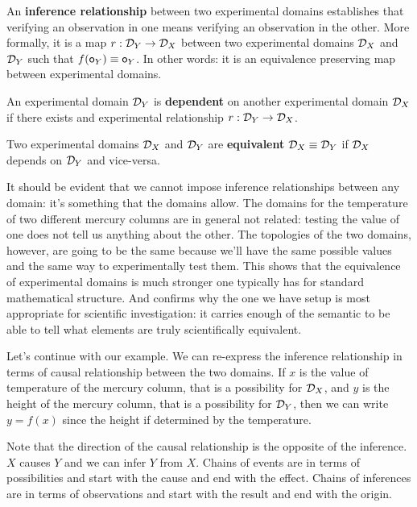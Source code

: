 \documentclass[11pt,letterpaper,fleqn]{memoir} %
\begin{document}
\begin{mathSection}
	\begin{defn}
		An \textbf{inference relationship} between two experimental domains establishes that verifying an observation in one means verifying an observation in the other. More formally, it is a map $r: \mathcal{D}_Y \to \mathcal{D}_X$ between two experimental domains $\mathcal{D}_X$ and $\mathcal{D}_Y$ such that $f(\mathsf{o}_Y) \equiv \mathsf{o}_Y$. In other words: it is an equivalence preserving map between experimental domains.
	\end{defn}
	\begin{defn}
		An experimental domain $\mathcal{D}_Y$ is \textbf{dependent} on another experimental domain $\mathcal{D}_X$ if there exists and experimental relationship $r: \mathcal{D}_Y \to \mathcal{D}_X$.
	\end{defn}
	\begin{defn}
		Two experimental domains $\mathcal{D}_X$ and $\mathcal{D}_Y$ are \textbf{equivalent} $\mathcal{D}_X \equiv \mathcal{D}_Y$ if $\mathcal{D}_X$ depends on $\mathcal{D}_Y$ and vice-versa.
	\end{defn}
\end{mathSection}

It should be evident that we cannot impose inference relationships between any domain: it's something that the domains allow. The domains for the temperature of two different mercury columns are in general not related: testing the value of one does not tell us anything about the other. The topologies of the two domains, however, are going to be the same because we'll have the same possible values and the same way to experimentally test them. This shows that the equivalence of experimental domains is much stronger one typically has for standard mathematical structure. And confirms why the one we have setup is most appropriate for scientific investigation: it carries enough of the semantic to be able to tell what elements are truly scientifically equivalent.

Let's continue with our example. We can re-express the inference relationship in terms of causal relationship between the two domains. If $x$ is the value of temperature of the mercury column, that is a possibility for $\mathcal{D}_X$, and $y$ is the height of the mercury column, that is a possibility for $\mathcal{D}_Y$, then we can write $y=f(x)$ since the height if determined by the temperature.

Note that the direction of the causal relationship is the opposite of the inference. $X$ causes $Y$ and we can infer $Y$ from $X$. Chains of events are in terms of possibilities and start with the cause and end with the effect. Chains of inferences are in terms of observations and start with the result and end with the origin.
\end{document}
